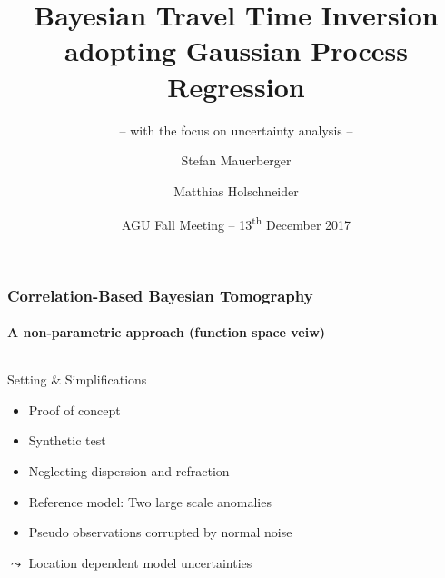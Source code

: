 \documentclass[aspectratio=169, t, 10pt]{beamer}
\title[Correlation based travel time inversion]{Bayesian Travel Time Inversion adopting Gaussian Process Regression}
\subtitle{-- with the focus on uncertainty analysis --}
\author[\tt mauerber@uni-potsdam.de]{Stefan Mauerberger \and Matthias Holschneider}
\institute[Math@UP]{University Potsdam, Institute of Mathematics}
\date[AGU~2017]{AGU Fall Meeting -- 13\textsuperscript{th} December 2017}
\begin{document}



\begin{frame}
    \frametitle{Correlation-Based Bayesian Tomography}
    \framesubtitle{A non-parametric approach (function space veiw)}

\begin{columns}%
%

    \begin{exampleblock}{Setting \& Simplifications}
        \begin{itemize}
            \item Proof of concept
            \item Synthetic test
            \item Neglecting dispersion and refraction
            \item Reference model: Two large scale anomalies
            \item Pseudo observations corrupted by normal noise
        \end{itemize}
        \hfill {\Large $\leadsto$} Location dependent model uncertainties ~
    \end{exampleblock}


    \vspace{-10mm}
    
\end{columns}

\end{frame}
\end{document}
